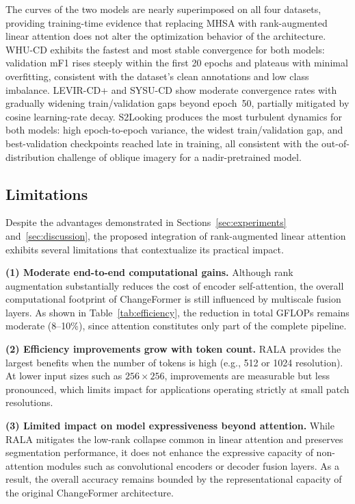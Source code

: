 \documentclass[runningheads]{llncs}
\newcommand{\journal}[1]{{\color{orange}#1}}
\begin{document}
\journal{%
The curves of the two models are nearly superimposed on all four datasets,
providing training-time evidence that replacing MHSA with rank-augmented
linear attention does not alter the optimization behavior of the
architecture.
WHU-CD exhibits the fastest and most stable convergence for both models:
validation mF1 rises steeply within the first 20 epochs and plateaus with
minimal overfitting, consistent with the dataset's clean annotations and low
class imbalance.
LEVIR-CD+ and SYSU-CD show moderate convergence rates with gradually widening
train/validation gaps beyond epoch~50, partially mitigated by cosine
learning-rate decay.
S2Looking produces the most turbulent dynamics for both models: high
epoch-to-epoch variance, the widest train/validation gap, and best-validation
checkpoints reached late in training, all consistent with the
out-of-distribution challenge of oblique imagery for a nadir-pretrained model.%
}

\subsection{Limitations}
\label{subsec:limitations}

Despite the advantages demonstrated in Sections~\ref{sec:experiments}
and~\ref{sec:discussion}, the proposed integration of rank-augmented linear
attention exhibits several limitations that contextualize its practical impact.

\noindent \textbf{(1) Moderate end-to-end computational gains.} Although rank
augmentation substantially reduces the cost of encoder self-attention, the
overall computational footprint of ChangeFormer is still influenced by
multiscale fusion layers. As shown in Table~\ref{tab:efficiency}, the reduction
in total GFLOPs remains moderate (8--10\%), since attention constitutes only
part of the complete pipeline.


\noindent \textbf{(2) Efficiency improvements grow with token count.} RALA
provides the largest benefits when the number of tokens is high (e.g., 512 or
1024 resolution). At lower input sizes such as $256\times256$, improvements are
measurable but less pronounced, which limits impact for applications operating
strictly at small patch resolutions.

\noindent \textbf{(3) Limited impact on model expressiveness beyond attention.}
While RALA mitigates the low-rank collapse common in linear attention and
preserves segmentation performance, it does not enhance the expressive capacity
of non-attention modules such as convolutional encoders or decoder fusion
layers. As a result, the overall accuracy remains bounded by the
representational capacity of the original ChangeFormer architecture.
\end{document}
